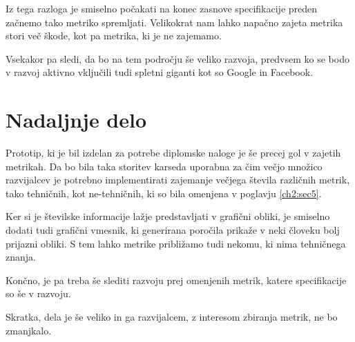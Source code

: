 \documentclass[a4paper, 12pt]{book}
\begin{document}
Iz tega razloga je smiselno počakati na konec zasnove specifikacije preden začnemo tako metriko spremljati. Velikokrat nam lahko napačno zajeta metrika stori več škode, kot pa metrika, ki je ne zajemamo.

Vsekakor pa sledi, da bo na tem področju še veliko razvoja, predvsem ko se bodo v razvoj aktivno vključili tudi spletni giganti kot so Google in Facebook. 

\section{Nadaljnje delo}
\label{ch4:sec1}

Prototip, ki je bil izdelan za potrebe diplomske naloge je še precej gol v zajetih metrikah. Da bo bila taka storitev karseda uporabna za čim večjo množico razvijalcev je potrebno implementirati zajemanje večjega števila različnih metrik, tako tehničnih, kot ne-tehničnih, ki so bila omenjena v poglavju \ref{ch2:sec5}.

Ker si je številske informacije lažje predstavljati v grafični obliki, je smiselno dodati tudi grafični vmesnik, ki generirana poročila prikaže v neki človeku bolj prijazni obliki. S tem lahko metrike približamo tudi nekomu, ki nima tehničnega znanja.

Končno, je pa treba še slediti razvoju prej omenjenih metrik, katere specifikacije so še v razvoju.

Skratka, dela je še veliko in ga razvijalcem, z interesom zbiranja metrik, ne bo zmanjkalo.

\newpage %
\ \\
\clearpage
{}


\end{document}

